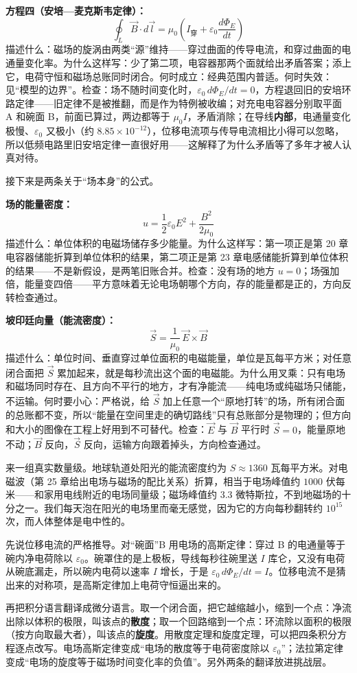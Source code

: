 \textbf{方程四（安培—麦克斯韦定律）：}
\[
\oint_L \vec B\cdot d\vec l=\mu_0\left(I_{\text{穿}}+\varepsilon_0\frac{d\varPhi_E}{dt}\right)
\]
描述什么：磁场的旋涡由两类“源”维持——穿过曲面的传导电流，和穿过曲面的电通量变化率。为什么这样写：少了第二项，电容器那两个面就给出矛盾答案；添上它，电荷守恒和磁场总账同时闭合。何时成立：经典范围内普适。何时失效：见“模型的边界”。检查：场不随时间变化时，\(\varepsilon_0\,d\varPhi_E/dt=0\)，方程退回旧的安培环路定律——旧定律不是被推翻，而是作为特例被收编；对充电电容器分别取平面 A 和碗面 B，前面已算过，两边都等于 \(\mu_0 I\)，矛盾消除；在导线\textbf{内部}，电通量变化极慢、\(\varepsilon_0\) 又极小（约 \(8.85\times10^{-12}\)），位移电流项与传导电流相比小得可以忽略，所以低频电路里旧安培定律一直很好用——这解释了为什么矛盾等了多年才被人认真对待。

接下来是两条关于“场本身”的公式。

\textbf{场的能量密度：}
\[
u=\frac{1}{2}\varepsilon_0 E^{2}+\frac{B^{2}}{2\mu_0}
\]
描述什么：单位体积的电磁场储存多少能量。为什么这样写：第一项正是第 20 章电容器储能折算到单位体积的结果，第二项正是第 23 章电感储能折算到单位体积的结果——不是新假设，是两笔旧账合并。检查：没有场的地方 \(u=0\)；场强加倍，能量变四倍——平方意味着无论电场朝哪个方向，存的能量都是正的，方向反转检查通过。

\textbf{坡印廷向量（能流密度）：}
\[
\vec S=\frac{1}{\mu_0}\,\vec E\times\vec B
\]
描述什么：单位时间、垂直穿过单位面积的电磁能量，单位是瓦每平方米；对任意闭合面把 \(\vec S\) 累加起来，就是每秒流出这个面的电磁能。为什么用叉乘：只有电场和磁场同时存在、且方向不平行的地方，才有净能流——纯电场或纯磁场只储能，不运输。何时要小心：严格说，给 \(\vec S\) 加上任意一个“原地打转”的场，所有闭合面的总账都不变，所以“能量在空间里走的确切路线”只有总账部分是物理的；但方向和大小的图像在工程上好用到不可替代。检查：\(\vec E\) 与 \(\vec B\) 平行时 \(\vec S=0\)，能量原地不动；\(\vec B\) 反向，\(\vec S\) 反向，运输方向跟着掉头，方向检查通过。

来一组真实数量级。地球轨道处阳光的能流密度约为 \(S\approx1360\) 瓦每平方米。对电磁波（第 25 章给出电场与磁场的配比关系）折算，相当于电场峰值约 \(1000\) 伏每米——和家用电线附近的电场同量级；磁场峰值约 \(3.3\) 微特斯拉，不到地磁场的十分之一。我们每天泡在阳光的电场里而毫无感觉，因为它的方向每秒翻转约 \(10^{15}\) 次，而人体整体是电中性的。

\begin{mathbridge}
先说位移电流的严格推导。对“碗面”B 用电场的高斯定律：穿过 B 的电通量等于碗内净电荷除以 \(\varepsilon_0\)。碗罩住的是上极板，导线每秒往碗里送 \(I\) 库仑，又没有电荷从碗底漏走，所以碗内电荷以速率 \(I\) 增长，于是 \(\varepsilon_0\,d\varPhi_E/dt=I\)。位移电流不是猜出来的对称项，是高斯定律加上电荷守恒逼出来的。

再把积分语言翻译成微分语言。取一个闭合面，把它越缩越小，缩到一个点：净流出除以体积的极限，叫该点的\textbf{散度}；取一个回路缩到一个点：环流除以面积的极限（按方向取最大者），叫该点的\textbf{旋度}。用散度定理和旋度定理，可以把四条积分方程逐点改写。电场高斯定律变成“电场的散度等于电荷密度除以 \(\varepsilon_0\)”；法拉第定律变成“电场的旋度等于磁场时间变化率的负值”。另外两条的翻译放进挑战层。
\end{mathbridge}

